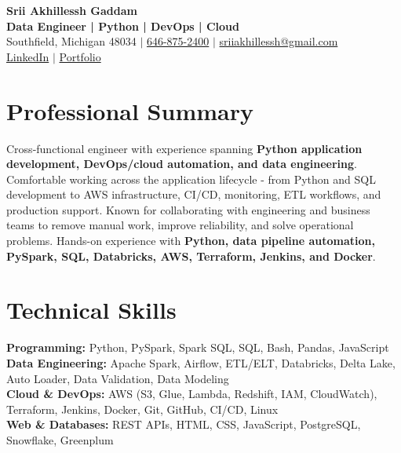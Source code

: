\documentclass[letterpaper,10pt]{article}
\begin{document}
\fontsize{9.35pt}{10.45pt}\selectfont

\begin{center}
    {\LARGE \textbf{Srii Akhillessh Gaddam}} \\[-1pt]
    \textbf{Data Engineer | Python | DevOps | Cloud} \\[2pt]
    Southfield, Michigan 48034 $|$
    \href{tel:6468752400}{646-875-2400} $|$
    \href{mailto:sriiakhillessh@gmail.com}{sriiakhillessh@gmail.com} \\[1pt]
    \href{https://www.linkedin.com/in/srii-akhiilessh-gaddam-b48668191/}{LinkedIn} $|$
    \href{https://sriiakhillesshg.github.io/portfolio/}{Portfolio}
\end{center}
\vspace{-8pt}

\section{Professional Summary}
\small{Cross-functional engineer with experience spanning \textbf{Python application development, DevOps/cloud automation, and data engineering}. Comfortable working across the application lifecycle - from Python and SQL development to AWS infrastructure, CI/CD, monitoring, ETL workflows, and production support. Known for collaborating with engineering and business teams to remove manual work, improve reliability, and solve operational problems. Hands-on experience with \textbf{Python, data pipeline automation, PySpark, SQL, Databricks, AWS, Terraform, Jenkins, and Docker}.}

\section{Technical Skills}
\small{
\textbf{Programming:} Python, PySpark, Spark SQL, SQL, Bash, Pandas, JavaScript \\
\textbf{Data Engineering:} Apache Spark, Airflow, ETL/ELT, Databricks, Delta Lake, Auto Loader, Data Validation, Data Modeling \\
\textbf{Cloud \& DevOps:} AWS (S3, Glue, Lambda, Redshift, IAM, CloudWatch), Terraform, Jenkins, Docker, Git, GitHub, CI/CD, Linux \\
\textbf{Web \& Databases:} REST APIs, HTML, CSS, JavaScript, PostgreSQL, Snowflake, Greenplum
}

\end{document}
